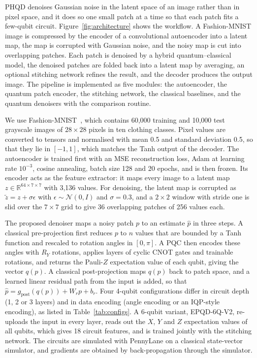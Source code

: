 PHQD denoises Gaussian noise in the latent space of an image rather than in pixel space, and it does so one small patch at a time so that each patch fits a few-qubit circuit. Figure~\ref{fig:architecture} shows the workflow. A Fashion-MNIST image is compressed by the encoder of a convolutional autoencoder into a latent map, the map is corrupted with Gaussian noise, and the noisy map is cut into overlapping patches. Each patch is denoised by a hybrid quantum--classical model, the denoised patches are folded back into a latent map by averaging, an optional stitching network refines the result, and the decoder produces the output image. The pipeline is implemented as five modules: the autoencoder, the quantum patch encoder, the stitching network, the classical baselines, and the quantum denoisers with the comparison routine.

We use Fashion-MNIST~\cite{fmnist}, which contains 60,000 training and 10,000 test grayscale images of $28\times28$ pixels in ten clothing classes. Pixel values are converted to tensors and normalised with mean 0.5 and standard deviation 0.5, so that they lie in $[-1,1]$, which matches the Tanh output of the decoder. The autoencoder is trained first with an MSE reconstruction loss, Adam at learning rate $10^{-3}$, cosine annealing, batch size 128 and 20 epochs, and is then frozen. Its encoder acts as the feature extractor: it maps every image to a latent map $z\in\mathbb{R}^{64\times7\times7}$ with 3,136 values. For denoising, the latent map is corrupted as $\tilde z=z+\sigma\epsilon$ with $\epsilon\sim\mathcal{N}(0,I)$ and $\sigma=0.3$, and a $2\times2$ window with stride one is slid over the $7\times7$ grid to give 36 overlapping patches of 256 values each.

The proposed denoiser maps a noisy patch $p$ to an estimate $\hat p$ in three steps. A classical pre-projection first reduces $p$ to $n$ values that are bounded by a Tanh function and rescaled to rotation angles in $[0,\pi]$. A PQC then encodes these angles with $R_Y$ rotations, applies layers of cyclic CNOT gates and trainable rotations, and returns the Pauli-$Z$ expectation value of each qubit, giving the vector $q(p)$. A classical post-projection maps $q(p)$ back to patch space, and a learned linear residual path from the input is added, so that $\hat p=g_{\mathrm{post}}(q(p))+W_rp+b_r$. Four 4-qubit configurations differ in circuit depth (1, 2 or 3 layers) and in data encoding (angle encoding or an IQP-style encoding), as listed in Table~\ref{tab:configs}. A 6-qubit variant, EPQD-6Q-V2, re-uploads the input in every layer, reads out the $X$, $Y$ and $Z$ expectation values of all qubits, which gives 18 circuit features, and is trained jointly with the stitching network. The circuits are simulated with PennyLane on a classical state-vector simulator, and gradients are obtained by back-propagation through the simulator.

